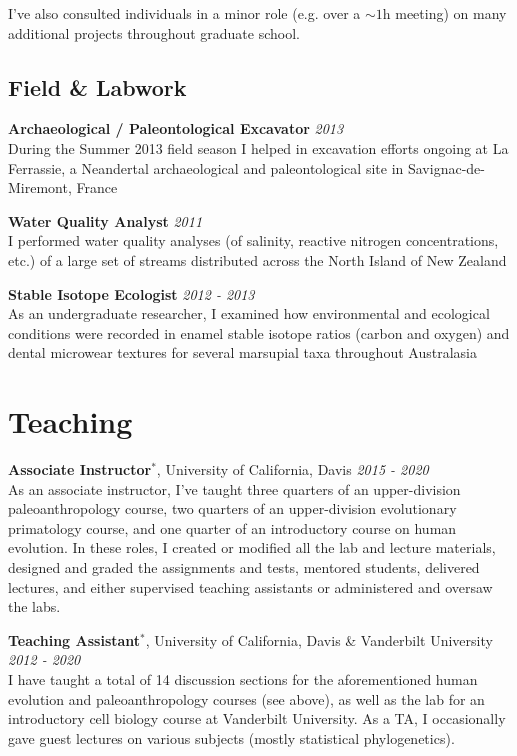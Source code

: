\documentclass[12pt]{article}
\begin{document}
I've also consulted individuals in a minor role (e.g. over a $\sim 1$h meeting) on many additional projects throughout graduate school.

\subsection{Field \& Labwork}

\textbf{Archaeological / Paleontological Excavator} \hfill \emph{2013}\\
During the Summer 2013 field season I helped in excavation efforts ongoing at La Ferrassie, a Neandertal archaeological and paleontological site in Savignac-de-Miremont, France


\textbf{Water Quality Analyst} \hfill \emph{2011}\\
I performed water quality analyses (of salinity, reactive nitrogen concentrations, etc.) of a large set of streams distributed across the North Island of New Zealand

\textbf{Stable Isotope Ecologist} \hfill \emph{2012 - 2013}\\
As an undergraduate researcher, I examined how environmental and ecological conditions were recorded in enamel stable isotope ratios (carbon and oxygen) and dental microwear textures for several marsupial taxa throughout Australasia

\section{Teaching}

\textbf{Associate Instructor$^{*}$}, University of California, Davis \hfill \emph{2015  - 2020}\\
As an associate instructor, I’ve taught three quarters of an upper-division paleoanthropology course, two quarters of an upper-division evolutionary primatology course, and one quarter of an introductory course on human evolution. In these roles, I created or modified all the lab and lecture materials, designed and graded the assignments and tests, mentored students, delivered lectures, and either supervised teaching assistants or administered and oversaw the labs.

\textbf{Teaching Assistant$^{*}$}, University of California, Davis \& Vanderbilt University \hfill \emph{2012  - 2020}\\
I have taught a total of 14 discussion sections for the aforementioned human evolution and paleoanthropology courses (see above), as well as the lab for an introductory cell biology course at Vanderbilt University. As a TA, I occasionally gave guest lectures on various subjects (mostly statistical phylogenetics).
\end{document}
